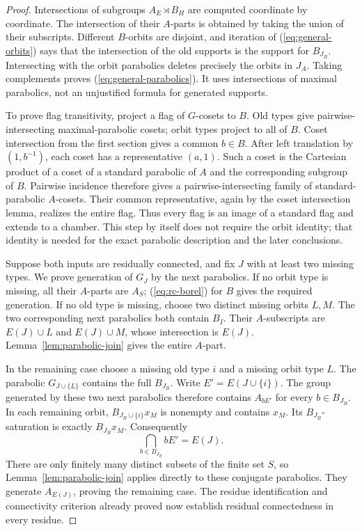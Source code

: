 \begin{proof}
Intersections of subgroups $A_E\rtimes B_H$ are computed coordinate by
coordinate. The intersection of their $A$-parts is obtained by taking
the union of their subscripts. Different $B$-orbits are disjoint, and
iteration of (\ref{eq:general-orbits}) says that the intersection of
the old supports is the support for $B_{J_B}$. Intersecting with the
orbit parabolics deletes precisely the orbits in $J_A$. Taking
complements proves (\ref{eq:general-parabolics}). It uses intersections
of maximal parabolics, not an unjustified formula for generated supports.

To prove flag transitivity, project a flag of $G$-cosets to $B$.
Old types give pairwise-intersecting maximal-parabolic cosets; orbit
types project to all of $B$. Coset intersection from the first section
gives a common $b\in B$. After left translation by $(1,b^{-1})$,
each coset has a representative $(a,1)$. Such a coset is the Cartesian
product of a coset of a standard parabolic of $A$ and the corresponding
subgroup of $B$. Pairwise incidence therefore gives a pairwise-intersecting
family of standard-parabolic $A$-cosets. Their common representative,
again by the coset intersection lemma, realizes the entire flag.
Thus every flag is an image of a standard flag and extends to a chamber.
This step by itself does not require the orbit identity; that identity
is needed for the exact parabolic description and the later conclusions.

Suppose both inputs are residually connected, and fix $J$ with at
least two missing types. We prove generation of $G_J$ by the next
parabolics. If no orbit type is missing, all their $A$-parts are $A_S$;
(\ref{eq:rc-borel}) for $B$ gives the required generation. If no old
type is missing, choose two distinct missing orbits $L,M$. The two
corresponding next parabolics both contain $B_I$. Their $A$-subscripts
are $E(J)\cup L$ and $E(J)\cup M$, whose intersection is $E(J)$.
Lemma~\ref{lem:parabolic-join} gives the entire $A$-part.

In the remaining case choose a missing old type $i$ and a missing
orbit type $L$. The parabolic $G_{J\cup\{L\}}$ contains the full
$B_{J_B}$. Write $E'=E(J\cup\{i\})$. The group generated by these
two next parabolics therefore contains $A_{bE'}$ for every
$b\in B_{J_B}$. In each remaining orbit, $B_{J_B\cup\{i\}}x_M$
is nonempty and contains $x_M$. Its $B_{J_B}$-saturation is exactly
$B_{J_B}x_M$. Consequently
\[
 \bigcap_{b\in B_{J_B}}bE'=E(J).
\]
There are only finitely many distinct subsets of the finite set $S$,
so Lemma~\ref{lem:parabolic-join} applies directly to these conjugate
parabolics. They generate $A_{E(J)}$, proving the remaining case.
The residue identification and connectivity criterion already proved
now establish residual connectedness in every residue.


\end{proof}

